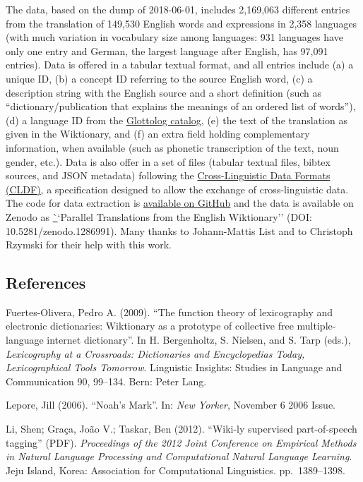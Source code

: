 \documentclass[
  a4paper,
  14pt,
  oneside,
  tablecaptionabove
]{scrbook}
\begin{document}
The data, based on the dump of 2018-06-01, includes 2,169,063 different
entries from the translation of 149,530 English words and expressions in
2,358 languages (with much variation in vocabulary size among languages:
931 languages have only one entry and German, the largest language after
English, has 97,091 entries). Data is offered in a tabular textual
format, and all entries include (a) a unique ID, (b) a concept ID
referring to the source English word, (c) a description string with the
English source and a short definition (such as ``dictionary/publication
that explains the meanings of an ordered list of words''), (d)
a language ID from the \href{http://glottolog.org}{Glottolog catalog},
(e) the text of the translation as given in the Wiktionary, and (f) an
extra field holding complementary information, when available (such as
phonetic transcription of the text, noun gender, etc.). Data is also
offer in a set of files (tabular textual files, bibtex sources, and JSON
metadata) following the \href{http://cldf.clld.org}{Cross-Linguistic
Data Formats (CLDF)}, a specification designed to allow the exchange of
cross-linguistic data. The code for data extraction is
\href{https://github.com/tresoldi/wiktionary_parser}{available on
GitHub} and the data is available on Zenodo as
\href{https://zenodo.org/record/1286991}``Parallel Translations from the
English Wiktionary'' (DOI: 10.5281/zenodo.1286991). Many thanks to
Johann-Mattis List and to Christoph Rzymski for their help with this
work.

\subsection*{References}

\nopagebreak\hangindent=0.7cm {\small Fuertes-Olivera, Pedro A. (2009). \enquote{The function theory of
lexicography and electronic dictionaries: Wiktionary as a prototype of
collective free multiple-language internet dictionary}. In H.
Bergenholtz, S. Nielsen, and S. Tarp (eds.), \emph{Lexicography at a
Crossroads: Dictionaries and Encyclopedias Today, Lexicographical Tools
Tomorrow}.  Linguistic Insights: Studies in Language and Communication
90, 99--134. Bern: Peter Lang. }

\nopagebreak\hangindent=0.7cm {\small Lepore, Jill (2006). \enquote{Noah's Mark}. In: \emph{New Yorker},
November 6 2006 Issue. }

\nopagebreak\hangindent=0.7cm {\small Li, Shen; Graça, João V.; Taskar, Ben (2012). \enquote{Wiki-ly
supervised part-of-speech tagging} (PDF). \emph{Proceedings of the 2012
Joint Conference on Empirical Methods in Natural Language Processing and
Computational Natural Language Learning}.  Jeju Island, Korea:
Association for Computational Linguistics. pp.~1389--1398. }
\end{document}
